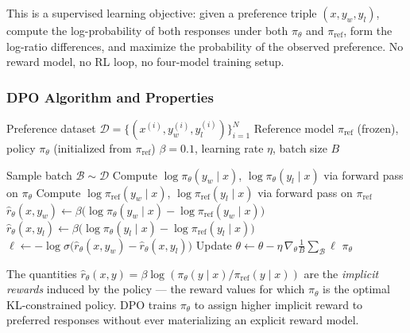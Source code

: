 \documentclass{book}
\begin{document}
This is a supervised learning objective: given a preference triple
$(x, y_w, y_l)$, compute the log-probability of both responses under both
$\pi_\theta$ and $\pi_{\text{ref}}$, form the log-ratio differences, and
maximize the probability of the observed preference. No reward model, no
RL loop, no four-model training setup.

\subsubsection{DPO Algorithm and Properties}
\label{sec:dpo_algorithm}

\begin{algorithm}[H]
\caption{Direct Preference Optimization (DPO)}
\label{alg:dpo}
\begin{algorithmic}[1]
\Require Preference dataset $\mathcal{D} = \{(x^{(i)}, y_w^{(i)},
    y_l^{(i)})\}_{i=1}^N$
\Require Reference model $\pi_{\text{ref}}$ (frozen),
    policy $\pi_\theta$ (initialized from $\pi_{\text{ref}}$)
\Require $\beta = 0.1$, learning rate $\eta$, batch size $B$

    \State Sample batch $\mathcal{B} \sim \mathcal{D}$
        \State Compute $\log \pi_\theta(y_w \mid x)$,
            $\log \pi_\theta(y_l \mid x)$ via forward pass on $\pi_\theta$
        \State Compute $\log \pi_{\text{ref}}(y_w \mid x)$,
            $\log \pi_{\text{ref}}(y_l \mid x)$ via forward pass on
            $\pi_{\text{ref}}$
        \State $\hat{r}_\theta(x, y_w) \leftarrow \beta
            \bigl(\log \pi_\theta(y_w \mid x)
            - \log \pi_{\text{ref}}(y_w \mid x)\bigr)$
        \State $\hat{r}_\theta(x, y_l) \leftarrow \beta
            \bigl(\log \pi_\theta(y_l \mid x)
            - \log \pi_{\text{ref}}(y_l \mid x)\bigr)$
        \State $\ell \leftarrow
            -\log \sigma\bigl(\hat{r}_\theta(x, y_w)
            - \hat{r}_\theta(x, y_l)\bigr)$
    \EndFor
    \State Update $\theta \leftarrow \theta
        - \eta\, \nabla_\theta \frac{1}{B}\sum_{\mathcal{B}} \ell$
\EndWhile
\State \Return $\pi_\theta$
\end{algorithmic}
\end{algorithm}

The quantities $\hat{r}_\theta(x, y) = \beta \log (\pi_\theta(y \mid x) /
\pi_{\text{ref}}(y \mid x))$ are the \emph{implicit rewards} induced by
the policy --- the reward values for which $\pi_\theta$ is the optimal
KL-constrained policy. DPO trains $\pi_\theta$ to assign higher implicit
reward to preferred responses without ever materializing an explicit reward
model.
\end{document}
